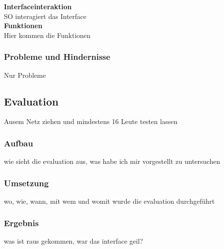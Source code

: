 \noindent \textbf{Interfaceinteraktion}\\
SO interagiert das Interface\\

\noindent \textbf{Funktionen}\\
Hier kommen die Funktionen\\


\subsubsection{Probleme und Hindernisse}
Nur Probleme

\subsection{Evaluation}
Ausem Netz ziehen und mindestens 16 Leute testen lassen

\subsubsection{Aufbau}
wie sieht die evaluation aus, was habe ich mir vorgestellt zu untersuchen

\subsubsection{Umsetzung}
wo, wie, wann, mit wem und womit wurde die evaluation durchgeführt

\subsubsection{Ergebnis}
was ist raus gekommen, war das interface geil?
